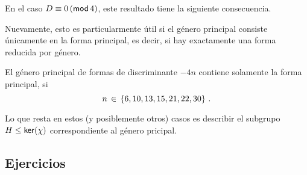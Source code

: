 \lemaGenerosBCoclases*

En el caso $D\equiv 0\tmodulo[4]$, este resultado tiene la siguiente
consecuencia.

\coroGenerosBDescenso*

Nuevamente, esto es particularmente \'util si el g\'enero principal
consiste \'unicamente en la forma principal, es decir, si hay
exactamente una forma reducida por g\'enero.

\begin{ejemResumen}\label{ejem:resumen}
	El g\'enero principal de formas de discriminante $-4n$
	contiene solamente la forma principal, si
	\begin{displaymath}
		n\,\in\,\{6,10,13,15,21,22,30\}
		\dispstop
	\end{displaymath}
\end{ejemResumen}

Lo que resta en estos (y posiblemente otros) casos es describir el
subgrupo $H\subgrpeq\ker(\chi)$ correspondiente al g\'enero pricipal.


\subsection*{Ejercicios}


